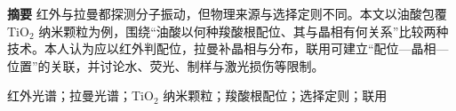 {\bfseries 摘要}\quad
红外与拉曼都探测分子振动，但物理来源与选择定则不同。本文以油酸包覆 TiO$_2$ 纳米颗粒为例，围绕“油酸以何种羧酸根配位、其与晶相有何关系”比较两种技术。本人认为应以红外判配位，拉曼补晶相与分布，联用可建立“配位—晶相—位置”的关联，并讨论水、荧光、制样与激光损伤等限制。

\vspace{4pt}

\par{}红外光谱；拉曼光谱；TiO$_2$ 纳米颗粒；羧酸根配位；选择定则；联用
